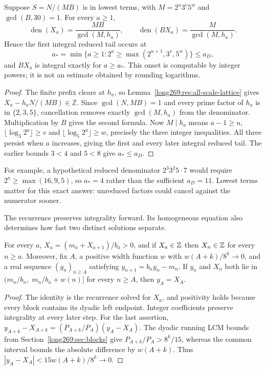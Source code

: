 \documentclass[11pt]{article}
\theoremstyle{remark}
\theoremstyle{plain}
\begin{document}
\begin{proposition}
\label{long269:res:exact-denominator}
Suppose $S=N/(MB)$ is in lowest terms, with $M=2^u3^v5^w$ and
$\gcd(B,30)=1$.  For every $a\ge1$,
\[
 \operatorname{den}(X_a)=\frac{MB}{\gcd(M,h_a)},\qquad
 \operatorname{den}(BX_a)=\frac{M}{\gcd(M,h_a)}.
\]
Hence the first integral reduced tail occurs at
\[
 a_* =\min\{a\ge1:2^a\ge\max(2^{u+1},3^v,5^w)\}\le a_D,
\]
and $BX_a$ is integral exactly for $a\ge a_*$.  This onset is computable by
integer powers; it is not an estimate obtained by rounding logarithms.
\end{proposition}
\begin{proof}
The finite prefix clears at $h_a$, so Lemma~\ref{long269:res:all-scale-lattice} gives $X_a-h_aN/(MB)\in\mathbb Z$. Since $\gcd(N,MB)=1$ and every prime factor of $h_a$ is in $\{2,3,5\}$, cancellation removes exactly $\gcd(M,h_a)$ from the denominator. Multiplication by $B$ gives the second formula.
Now $M\mid h_a$ means
$a-1\ge u$, $\lfloor\log_3 2^a\rfloor\ge v$ and
$\lfloor\log_5 2^a\rfloor\ge w$, precisely the three integer inequalities.
All three persist when $a$ increases, giving the first and every later
integral reduced tail.  The earlier bounds $3<4$ and $5<8$ give $a_*\le a_D$.
\end{proof}
For example, a hypothetical reduced denominator $2^3 3^2 5\cdot7$ would
require $2^a\ge\max(16,9,5)$, so $a_*=4$ rather than the sufficient
$a_D=11$.  Lowest terms matter for this exact answer: unreduced factors
could cancel against the numerator sooner.

The recurrence preserves integrality forward.  Its homogeneous equation
also determines how fast two distinct solutions separate.

\begin{proposition}\label{long269:res:pinning}
For every $a$, $X_a=(m_a+X_{a+1})/b_a>0$, and if $X_a\in\mathbb{Z}$ then $X_n\in\mathbb{Z}$ for
every $n\ge a$.  Moreover, fix $A$, a positive width function $w$ with
$w(A+k)/8^{k}\to0$, and a real sequence $(y_n)_{n\ge A}$ satisfying
$y_{n+1}=b_ny_n-m_n$.  If $y_n$ and $X_n$ both lie in
$(m_n/b_n,\;m_n/b_n+w(n)]$ for every $n\ge A$, then $y_A=X_A$.
\end{proposition}

\begin{proof}
The identity is the recurrence solved for $X_a$, and positivity holds because
every block contains its dyadic left endpoint.  Integer coefficients preserve integrality at every later step.  For the last assertion,
$y_{A+k}-X_{A+k}=(P_{A+k}/P_A)(y_A-X_A)$.
The dyadic running LCM bounds from Section~\ref{long269:sec:blocks} give
$P_{A+k}/P_A>8^k/15$, whereas the common interval bounds the absolute
difference by $w(A+k)$.  Thus
$|y_A-X_A|<15w(A+k)/8^k\to0$.
\end{proof}
\end{document}
